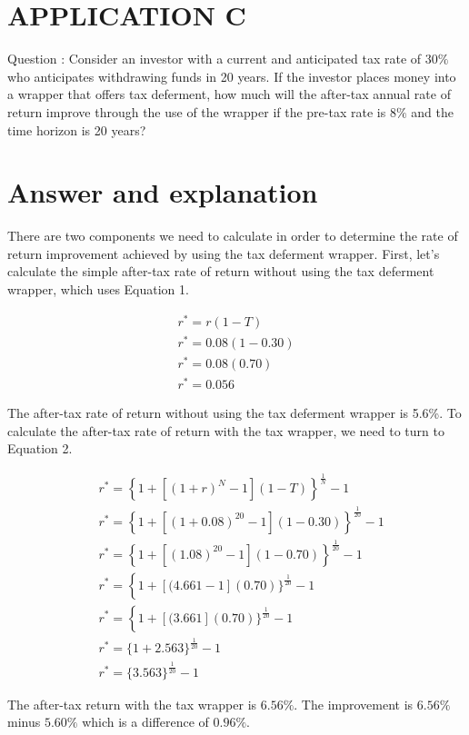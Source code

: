 \documentclass[11pt]{article}
\begin{document}
\section*{APPLICATION C}
Question : Consider an investor with a current and anticipated tax rate of $30 \%$ who anticipates withdrawing funds in 20 years. If the investor places money into a wrapper that offers tax deferment, how much will the after-tax annual rate of return improve through the use of the wrapper if the pre-tax rate is $8 \%$ and the time horizon is 20 years?

\section*{Answer and explanation}
There are two components we need to calculate in order to determine the rate of return improvement achieved by using the tax deferment wrapper. First, let's calculate the simple after-tax rate of return without using the tax deferment wrapper, which uses Equation 1.

$$
\begin{gathered}
r^{*}=r(1-T) \\
r^{*}=0.08(1-0.30) \\
r^{*}=0.08(0.70) \\
r^{*}=0.056
\end{gathered}
$$

The after-tax rate of return without using the tax deferment wrapper is 5.6\%. To calculate the after-tax rate of return with the tax wrapper, we need to turn to Equation 2.

$$
\begin{aligned}
& r^{*}=\left\{1+\left[(1+r)^{N}-1\right](1-T)\right\}^{\frac{1}{N}}-1 \\
& r^{*}=\left\{1+\left[(1+0.08)^{20}-1\right](1-0.30)\right\}^{\frac{1}{20}}-1 \\
& r^{*}=\left\{1+\left[(1.08)^{20}-1\right](1-0.70)\right\}^{\frac{1}{20}}-1 \\
& r^{*}=\left\{1+[(4.661-1](0.70)\}^{\frac{1}{20}}-1\right. \\
& r^{*}=\left\{1+[(3.661](0.70)\}^{\frac{1}{20}}-1\right. \\
& r^{*}=\{1+2.563\}^{\frac{1}{20}}-1 \\
& r^{*}=\{3.563\}^{\frac{1}{20}}-1
\end{aligned}
$$

The after-tax return with the tax wrapper is $6.56 \%$. The improvement is $6.56 \%$ minus $5.60 \%$ which is a difference of $0.96 \%$.
\end{document}
